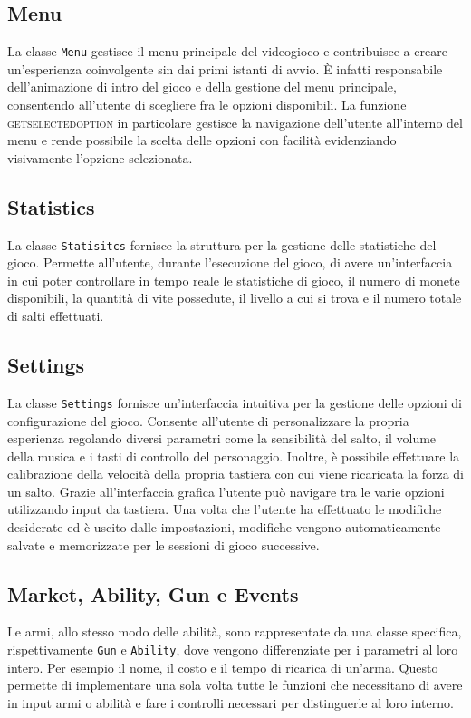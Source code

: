 \documentclass[a4paper]{article}
\begin{document}
\subsection{Menu}
La classe \texttt{Menu} gestisce il menu principale del videogioco e 
contribuisce a creare un’esperienza coinvolgente sin dai primi istanti di avvio. 
È infatti responsabile dell’animazione di intro del gioco e della gestione del 
menu principale, consentendo all’utente di scegliere fra le opzioni disponibili.
La funzione \textsc{getselectedoption} in particolare gestisce la navigazione 
dell’utente all’interno del menu e rende possibile la scelta delle opzioni con 
facilità evidenziando visivamente l’opzione selezionata. 


\subsection{Statistics}
La classe \texttt{Statisitcs} fornisce la struttura per la gestione delle 
statistiche del gioco. Permette all’utente, durante l’esecuzione del gioco, di 
avere un’interfaccia in cui poter controllare in tempo reale le statistiche di 
gioco, il numero di monete disponibili, la quantità di vite possedute, il 
livello a cui si trova e il numero totale di salti effettuati.

\subsection{Settings}
La classe \texttt{Settings} fornisce un'interfaccia intuitiva per la gestione 
delle opzioni di configurazione del gioco. Consente all’utente di personalizzare 
la propria esperienza regolando diversi parametri come la sensibilità del salto, 
il volume della musica e i tasti di controllo del personaggio. Inoltre, è 
possibile effettuare la calibrazione della velocità della propria tastiera con 
cui viene ricaricata la forza di un salto. Grazie all’interfaccia grafica 
l’utente può navigare tra le varie opzioni utilizzando input da tastiera. Una 
volta che l’utente ha effettuato le modifiche desiderate ed è uscito dalle 
impostazioni, modifiche vengono automaticamente salvate e memorizzate per le 
sessioni di gioco successive.

\subsection{Market, Ability, Gun e Events}
Le armi, allo stesso modo delle abilità, sono rappresentate da una classe 
specifica, rispettivamente \texttt{Gun} e \texttt{Ability}, dove vengono
differenziate per i parametri al loro intero. Per esempio il nome, il costo e il 
tempo di ricarica di un'arma. Questo permette di implementare una sola volta 
tutte le funzioni che necessitano di avere in input armi o abilità e fare i 
controlli necessari per distinguerle al loro interno.
\end{document}
